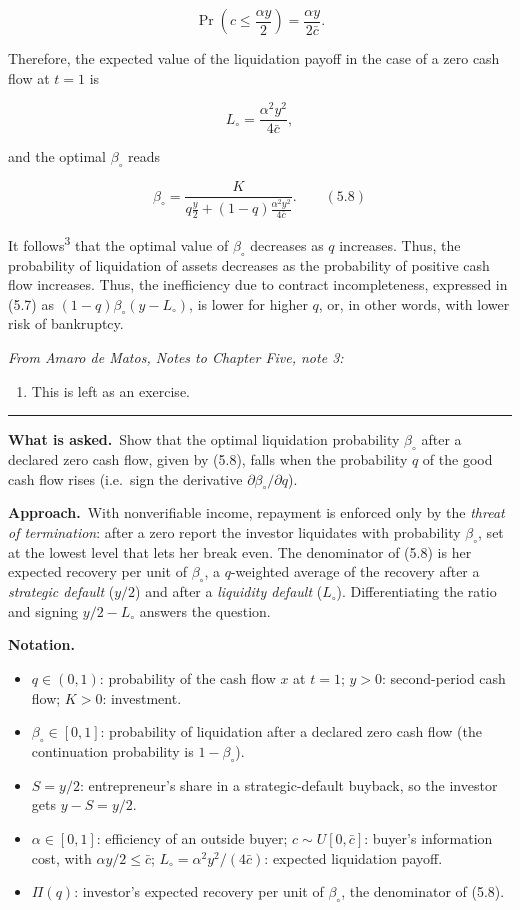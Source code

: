 \documentclass[11pt,a4paper]{article}
\newcommand{\notation}{\par\noindent\textbf{Notation.}}
\newcommand{\asked}{\par\medskip\noindent\textbf{What is asked.}~}
\newcommand{\approach}{\par\smallskip\noindent\textbf{Approach.}~}
\providecommand{\tightlist}{\setlength{\itemsep}{0pt}\setlength{\parskip}{0pt}}
\newcommand{\stmtend}{\par\endgroup\nopagebreak\noindent\rule{\linewidth}{0.4pt}\par\medskip}
\begin{document}
\[\Pr\left(c \leq \frac{\alpha y}{2}\right) = \frac{\alpha y}{2\bar c}.\]

Therefore, the expected value of the liquidation payoff in the case of a zero cash flow at \(t = 1\)
is

\[L_\circ = \frac{\alpha^2 y^2}{4\bar c},\]

and the optimal \(\beta_\circ\) reads

\[\beta_\circ = \frac{K}{q\frac{y}{2} + (1 - q)\frac{\alpha^2 y^2}{4\bar c}}. \qquad (5.8)\]

It follows\textsuperscript{3} that the optimal value of \(\beta_\circ\) decreases as \(q\)
increases. Thus, the probability of liquidation of assets decreases as the probability of positive
cash flow increases. Thus, the inefficiency due to contract incompleteness, expressed in (5.7) as
\((1 - q)\beta_\circ(y - L_\circ)\), is lower for higher \(q\), or, in other words, with lower risk
of bankruptcy.

\emph{From Amaro de Matos, Notes to Chapter Five, note 3:}

\begin{enumerate}
\def\labelenumi{\arabic{enumi}.}
\setcounter{enumi}{2}
\tightlist
\item
  This is left as an exercise.
\end{enumerate}
\stmtend

\asked Show that the optimal liquidation probability $\beta_\circ$ after a declared zero cash flow,
given by (5.8), falls when the probability $q$ of the good cash flow rises (i.e.\ sign the derivative
$\partial\beta_\circ/\partial q$).

\approach With nonverifiable income, repayment is enforced only by the \emph{threat of termination}:
after a zero report the investor liquidates with probability $\beta_\circ$, set at the lowest level that
lets her break even. The denominator of (5.8) is her expected recovery per unit of $\beta_\circ$, a
$q$-weighted average of the recovery after a \emph{strategic default} ($y/2$) and after a \emph{liquidity
default} ($L_\circ$). Differentiating the ratio and signing $y/2-L_\circ$ answers the question.

\notation
\begin{itemize}
  \item $q\in(0,1)$: probability of the cash flow $x$ at $t=1$; $y>0$: second-period cash flow; $K>0$: investment.
  \item $\beta_\circ\in[0,1]$: probability of liquidation after a declared zero cash flow (the continuation probability is $1-\beta_\circ$).
  \item $S=y/2$: entrepreneur's share in a strategic-default buyback, so the investor gets $y-S=y/2$.
  \item $\alpha\in[0,1]$: efficiency of an outside buyer; $c\sim U[0,\bar c]$: buyer's information cost, with $\alpha y/2\leq\bar c$; $L_\circ=\alpha^2y^2/(4\bar c)$: expected liquidation payoff.
  \item $\Pi(q)$: investor's expected recovery per unit of $\beta_\circ$, the denominator of (5.8).
\end{itemize}
\end{document}
